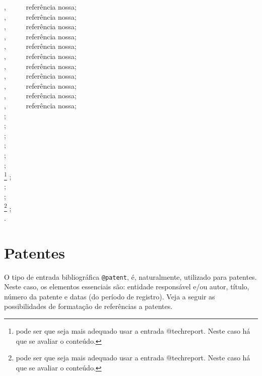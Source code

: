 \begin{apendicesenv}
{\small
	\cite{abnTeX22014b}  , \ \ \ \ \ referência nossa;\\
	\cite{abnTeX22014c}  , \ \ \ \ \ referência nossa;\\
	\cite{abnTeX22014d}  , \ \ \ \ \ referência nossa;\\
	\cite{NBR6023:2002}  , \ \ \ \ \ referência nossa;\\
	\cite{NBR6022:2003}  , \ \ \ \ \ referência nossa;\\
	\cite{NBR6024:2003}  , \ \ \ \ \ referência nossa;\\
	\cite{NBR6027:2003}  , \ \ \ \ \ referência nossa;\\
	\cite{NBR10520:2002}  , \ \ \ \ \ referência nossa;\\
	\cite{NBR15287:2005}  , \ \ \ \ \ referência nossa;\\
	\cite{NBR6029:2006}  , \ \ \ \ \ referência nossa;\\
	\cite{NBR14724:2011}  , \ \ \ \ \ referência nossa;\\
	\cite{francco1996}  ;\\
	\cite{geografico1986}  ;\\
	\cite{geografico1994}  ;\\
	\cite{moreira1997}  ;\\
	\cite{museu1997}  ;\\
	\cite{resprinb1997}  ;\\
	\cite{secretaria1989}\footnote{pode ser que seja mais adequado usar a entrada {\ttfamily @techreport}. Neste caso há que se avaliar o conteúdo.} ;\\
	\cite{secretaria1993}  ;\\
	\cite{universidade1993} ;\\
	\cite{justica1993}\footnote{pode ser que seja mais adequado usar a entrada {\ttfamily @techreport}. Neste caso há que se avaliar o conteúdo.} ;\\
	\cite{vicosa1994} .\\
}



\section{Patentes}
\label{sec:patent}

O tipo de entrada bibliográfica \verb|@patent|, é, naturalmente, utilizado para patentes. Neste caso, os elementos essenciais são: entidade responsável e/ou autor, título, número da patente e datas (do período de registro). Veja a seguir as possibilidades de formatação de referências a patentes.


\end{apendicesenv}

